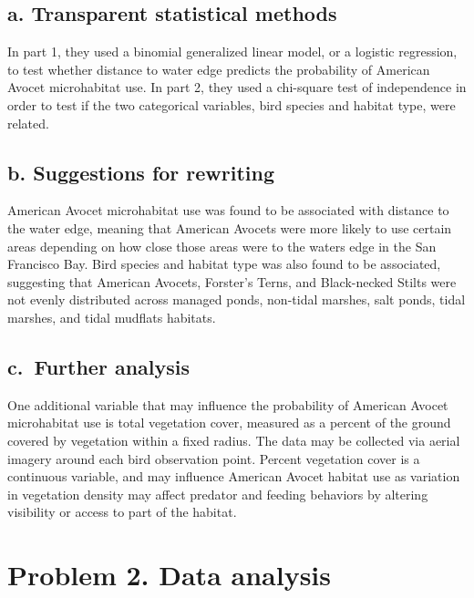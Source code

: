 \documentclass[
  letterpaper,
  DIV=11,
  numbers=noendperiod]{scrartcl}
\begin{document}
\subsection{a. Transparent statistical
methods}\label{a.-transparent-statistical-methods}

In part 1, they used a binomial generalized linear model, or a logistic
regression, to test whether distance to water edge predicts the
probability of American Avocet microhabitat use. In part 2, they used a
chi-square test of independence in order to test if the two categorical
variables, bird species and habitat type, were related.

\subsection{b. Suggestions for
rewriting}\label{b.-suggestions-for-rewriting}

American Avocet microhabitat use was found to be associated with
distance to the water edge, meaning that American Avocets were more
likely to use certain areas depending on how close those areas were to
the waters edge in the San Francisco Bay. Bird species and habitat type
was also found to be associated, suggesting that American Avocets,
Forster's Terns, and Black-necked Stilts were not evenly distributed
across managed ponds, non-tidal marshes, salt ponds, tidal marshes, and
tidal mudflats habitats.

\subsection{c.~Further analysis}\label{c.-further-analysis}

One additional variable that may influence the probability of American
Avocet microhabitat use is total vegetation cover, measured as a percent
of the ground covered by vegetation within a fixed radius. The data may
be collected via aerial imagery around each bird observation point.
Percent vegetation cover is a continuous variable, and may influence
American Avocet habitat use as variation in vegetation density may
affect predator and feeding behaviors by altering visibility or access
to part of the habitat.

\section{\texorpdfstring{\textbf{Problem 2. Data
analysis}}{Problem 2. Data analysis}}\label{problem-2.-data-analysis}
\end{document}
